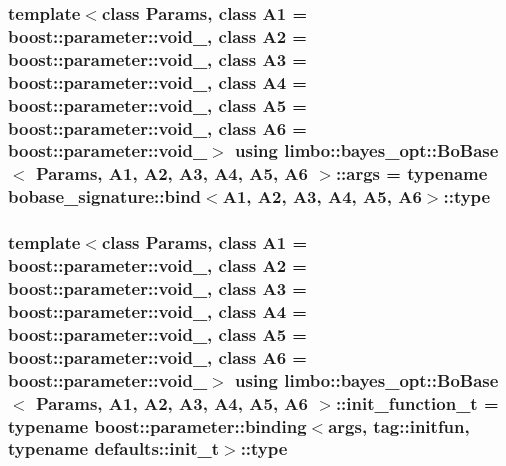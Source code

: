 \subsubsection[{\texorpdfstring{args}{args}}]{\setlength{\rightskip}{0pt plus 5cm}template$<$class Params, class A1 = boost\+::parameter\+::void\+\_\+, class A2 = boost\+::parameter\+::void\+\_\+, class A3 = boost\+::parameter\+::void\+\_\+, class A4 = boost\+::parameter\+::void\+\_\+, class A5 = boost\+::parameter\+::void\+\_\+, class A6 = boost\+::parameter\+::void\+\_\+$>$ using {\bf limbo\+::bayes\+\_\+opt\+::\+Bo\+Base}$<$ Params, A1, A2, A3, A4, A5, A6 $>$\+::{\bf args} =  typename bobase\+\_\+signature\+::bind$<$A1, A2, A3, A4, A5, A6$>$\+::type}\hypertarget{classlimbo_1_1bayes__opt_1_1_bo_base_a800d7d9dec5ac0c12b93150f12db9be3}{}\label{classlimbo_1_1bayes__opt_1_1_bo_base_a800d7d9dec5ac0c12b93150f12db9be3}
\subsubsection[{\texorpdfstring{init\+\_\+function\+\_\+t}{init_function_t}}]{\setlength{\rightskip}{0pt plus 5cm}template$<$class Params, class A1 = boost\+::parameter\+::void\+\_\+, class A2 = boost\+::parameter\+::void\+\_\+, class A3 = boost\+::parameter\+::void\+\_\+, class A4 = boost\+::parameter\+::void\+\_\+, class A5 = boost\+::parameter\+::void\+\_\+, class A6 = boost\+::parameter\+::void\+\_\+$>$ using {\bf limbo\+::bayes\+\_\+opt\+::\+Bo\+Base}$<$ Params, A1, A2, A3, A4, A5, A6 $>$\+::{\bf init\+\_\+function\+\_\+t} =  typename boost\+::parameter\+::binding$<${\bf args}, tag\+::initfun, typename {\bf defaults\+::init\+\_\+t}$>$\+::type}\hypertarget{classlimbo_1_1bayes__opt_1_1_bo_base_a0cd0e388e42c62bc38e02c096d8ae245}{}\label{classlimbo_1_1bayes__opt_1_1_bo_base_a0cd0e388e42c62bc38e02c096d8ae245}
